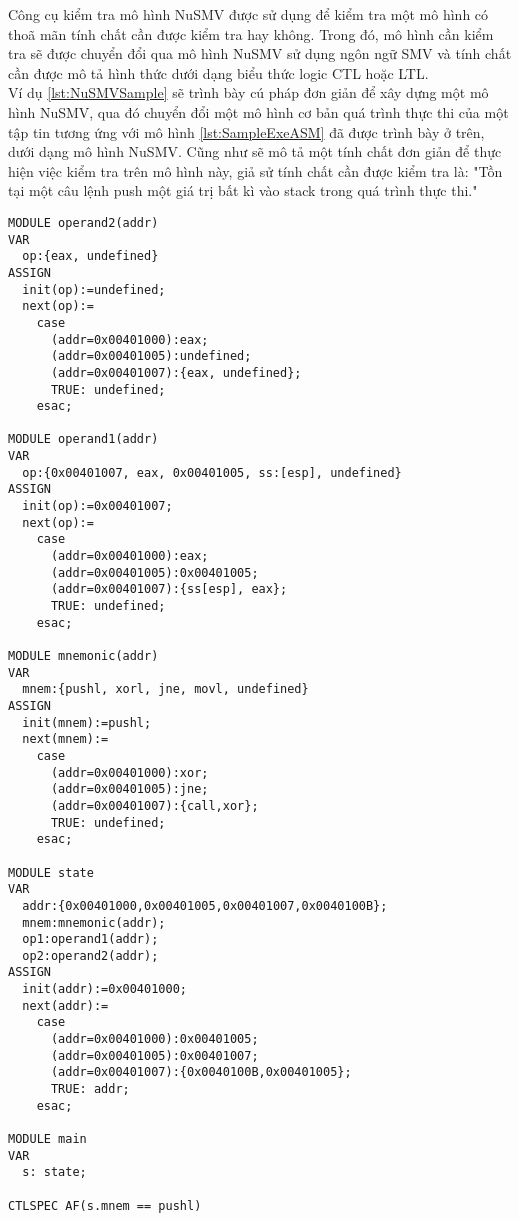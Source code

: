 \hspace{0.5cm}Công cụ kiểm tra mô hình NuSMV được sử dụng để kiểm tra một mô hình có thoã mãn tính chất cần được kiểm tra hay không. Trong đó, mô hình cần kiểm tra sẽ được chuyển đổi qua mô hình NuSMV sử dụng ngôn ngữ SMV và tính chất cần được mô tả hình thức dưới dạng biểu thức logic CTL hoặc LTL.\\

\hspace{0.5cm}Ví dụ \ref {lst:NuSMVSample} sẽ trình bày cú pháp đơn giản để xây dựng một mô hình NuSMV, qua đó chuyển đổi một mô hình cơ bản quá trình thực thi của một tập tin tương ứng với mô hình \ref {lst:SampleExeASM} đã được trình bày ở trên, dưới dạng mô hình NuSMV. Cũng như sẽ mô tả một tính chất đơn giản để thực hiện việc kiểm tra trên mô hình này, giả sử tính chất cần được kiểm tra là: "Tồn tại một câu lệnh push một giá trị bất kì vào stack trong quá trình thực thi."

\begin{code}
\begin{lstlisting}[captionpos=b,caption={Ví dụ về kiểm tra mô hình trên NuSMV},label={lst:NuSMVSample},frame=single]
MODULE operand2(addr)
VAR
  op:{eax, undefined}
ASSIGN
  init(op):=undefined;
  next(op):=
    case
      (addr=0x00401000):eax;
      (addr=0x00401005):undefined;
      (addr=0x00401007):{eax, undefined};
      TRUE: undefined;
    esac;

MODULE operand1(addr)
VAR
  op:{0x00401007, eax, 0x00401005, ss:[esp], undefined}
ASSIGN
  init(op):=0x00401007;
  next(op):=
    case
      (addr=0x00401000):eax;
      (addr=0x00401005):0x00401005;
      (addr=0x00401007):{ss[esp], eax};
      TRUE: undefined;
    esac;

MODULE mnemonic(addr)
VAR
  mnem:{pushl, xorl, jne, movl, undefined}
ASSIGN
  init(mnem):=pushl;
  next(mnem):=
    case
      (addr=0x00401000):xor;
      (addr=0x00401005):jne;
      (addr=0x00401007):{call,xor};
      TRUE: undefined;
    esac;

MODULE state
VAR
  addr:{0x00401000,0x00401005,0x00401007,0x0040100B};
  mnem:mnemonic(addr);
  op1:operand1(addr);
  op2:operand2(addr);
ASSIGN
  init(addr):=0x00401000;
  next(addr):=
    case
      (addr=0x00401000):0x00401005;
      (addr=0x00401005):0x00401007;
      (addr=0x00401007):{0x0040100B,0x00401005};
      TRUE: addr;
    esac;

MODULE main
VAR
  s: state;

CTLSPEC AF(s.mnem == pushl)

\end{lstlisting}
\end{code}

